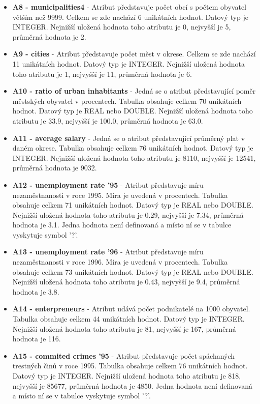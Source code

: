 \documentclass{article}
\begin{document}
\begin{itemize}
	\item \textbf{A8 - municipalities4} -  
	Atribut představuje počet obcí s počtem obyvatel větším než 9999. Celkem se zde nachází 6 unikátních hodnot. Datový typ je INTEGER. Nejnižší uložená hodnota toho atributu je 0, nejvyšší je 5, průměrná hodnota je 2. 

	
	\item \textbf{A9 - cities} - Atribut představuje počet měst v okrese. Celkem se zde nachází 11 unikátních hodnot. Datový typ je INTEGER. Nejnižší uložená hodnota toho atributu je 1, nejvyšší je 11, průměrná hodnota je 6.  
	
	\item \textbf{A10 - ratio of urban inhabitants} - Jedná se o atribut představující poměr městských obyvatel v procentech. Tabulka obsahuje celkem 70 unikátních hodnot. Datový typ je REAL nebo DOUBLE. Nejnižší uložená hodnota toho atributu je 33.9, nejvyšší je 100.0, průměrná hodnota je 63.0.
	
	\item \textbf{A11 - average salary} - Jedná se o atribut představující průměrný plat v daném okrese. Tabulka obsahuje celkem 76 unikátních hodnot. Datový typ je INTEGER. Nejnižší uložená hodnota toho atributu je 8110, nejvyšší je 12541, průměrná hodnota je 9032. 
	
	\item \textbf{A12 - unemployment rate '95} -  Atribut představuje míru nezaměstnanosti v roce 1995. Míra je uvedená v procentech. Tabulka obsahuje celkem 71 unikátních hodnot. Datový typ je REAL nebo DOUBLE. Nejnižší uložená hodnota toho atributu je 0.29, nejvyšší je 7.34, průměrná hodnota je 3.1. Jedna hodnota není definovaná a místo ní se v tabulce vyskytuje symbol '?'.
	
	\item \textbf{A13 - unemployment rate '96} - Atribut představuje míru nezaměstnanosti v roce 1996. Míra je uvedená v procentech. Tabulka obsahuje celkem 73 unikátních hodnot. Datový typ je REAL nebo DOUBLE. Nejnižší uložená hodnota toho atributu je 0.43, nejvyšší je 9.4, průměrná hodnota je 3.8.
	
	\item \textbf{A14 - enterpreneurs} -  Atribut udává počet podnikatelé na 1000 obyvatel. Tabulka obsahuje celkem 44 unikátních hodnot. Datový typ je INTEGER. Nejnižší uložená hodnota toho atributu je 81, nejvyšší je 167, průměrná hodnota je 116. 

	
	\item \textbf{A15 - commited crimes '95} - Atribut představuje počet spáchaných trestných činů v roce 1995. Tabulka obsahuje celkem 76 unikátních hodnot. Datový typ je INTEGER. Nejnižší uložená hodnota toho atributu je 818, nejvyšší je 85677, průměrná hodnota je 4850. Jedna hodnota není definovaná a místo ní se v tabulce vyskytuje symbol '?'.


\end{itemize}
\end{document}
